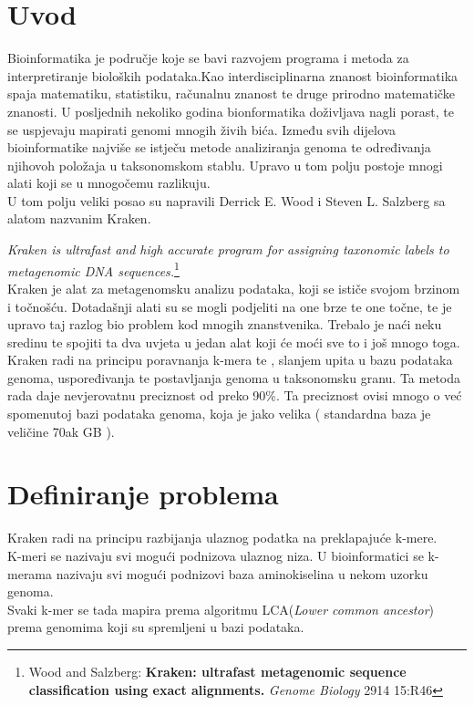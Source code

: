 \documentclass[times, utf8, zavrsni]{fer}
\begin{document}
\chapter{Uvod}
Bioinformatika je područje koje se bavi razvojem programa i metoda za interpretiranje bioloških podataka.Kao interdisciplinarna znanost bioinformatika spaja matematiku, statistiku, računalnu znanost te druge prirodno matematičke znanosti. U posljednih nekoliko godina bionformatika doživljava nagli porast, te se uspjevaju mapirati genomi mnogih živih bića. Između svih dijelova bioinformatike najviše se istječu metode analiziranja genoma te određivanja njihovoh položaja u taksonomskom stablu.
Upravo u tom polju postoje mnogi alati koji se u mnogočemu razlikuju.
\\ U tom polju veliki posao su napravili Derrick E. Wood i Steven L. Salzberg sa alatom nazvanim Kraken.\\{\textit{Kraken is ultrafast and high accurate program for assigning taxonomic labels to metagenomic DNA sequences.}\footnote[1]{Wood and Salzberg: \textbf{Kraken: ultrafast metagenomic sequence classification using exact alignments.} \textit{Genome Biology} 2914 15:R46}\\ Kraken je alat za metagenomsku analizu podataka,  koji se ističe svojom brzinom i točnošću. Dotadašnji alati su se mogli podjeliti na one brze te one točne, te je upravo taj razlog bio problem kod mnogih znanstvenika. Trebalo je naći neku sredinu te spojiti ta dva uvjeta u jedan alat koji će moći sve to i još mnogo toga. Kraken radi na principu poravnanja k-mera te , slanjem upita u bazu podataka genoma, uspoređivanja te postavljanja genoma u taksonomsku granu. Ta metoda rada daje nevjerovatnu preciznost od preko 90\%. Ta preciznost ovisi mnogo o već spomenutoj bazi podataka genoma, koja je jako velika ( standardna baza je veličine 70ak GB ).



\chapter{Definiranje problema}
Kraken radi na principu razbijanja ulaznog podatka na preklapajuće k-mere.
\\K-meri se nazivaju svi mogući podnizova ulaznog niza. U bioinformatici se k-merama nazivaju svi mogući podnizovi baza aminokiselina u nekom uzorku genoma.
\\Svaki k-mer se tada mapira prema algoritmu LCA(\textit{Lower common ancestor}) prema genomima koji su spremljeni u bazi podataka.



}
\end{document}
